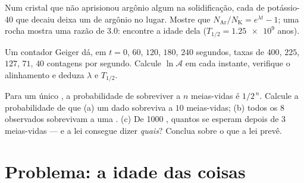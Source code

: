 \begin{exercise}[$\star\star\star$]\label{exo:g12:radioactive-decay:13}
Num cristal que não aprisionou argônio algum na solidificação, cada  de
potássio-40 que decaiu deixa um  de argônio no lugar. Mostre que
$N_{\mathrm{Ar}}/N_{\mathrm K} = e^{\lambda t} - 1$; uma rocha mostra uma razão de
$3.0$: encontre a idade dela ($T_{1/2} = \num{1.25e9}$ anos).
\end{exercise}

\begin{exercise}[$\star\star\star$]\label{exo:g12:radioactive-decay:14}
Um contador Geiger dá, em $t = 0$, $60$, $120$, $180$, $240$ segundos, taxas de $400$,
$225$, $127$, $71$, $40$ contagens por segundo. Calcule $\ln \mathcal A$ em cada
instante, verifique o alinhamento e deduza $\lambda$ e $T_{1/2}$.
\end{exercise}

\begin{exercise}[$\star\star\star$]\label{exo:g12:radioactive-decay:15}
Para um único , a probabilidade de sobreviver a $n$ meias-vidas é $1/2^{\,n}$.
Calcule a probabilidade de que (a) um dado  sobreviva a $10$ meias-vidas; (b)
todos os $8$  observados sobrevivam a uma . (c) De \num{1000} ,
quantos se esperam depois de $3$ meias-vidas --- e a lei consegue dizer \emph{quais}?
Conclua sobre o que a lei prevê.
\end{exercise}

\section{Problema: a idade das coisas}

